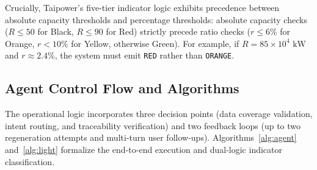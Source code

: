 \documentclass[conference]{IEEEtran}
\begin{document}
Crucially, Taipower's five-tier indicator logic exhibits precedence between absolute capacity thresholds and percentage thresholds: absolute capacity checks ($R \le 50$ for Black, $R \le 90$ for Red) strictly precede ratio checks ($r \le 6\%$ for Orange, $r < 10\%$ for Yellow, otherwise Green). For example, if $R = 85 \times 10^4\text{ kW}$ and $r \approx 2.4\%$, the system must emit \texttt{RED} rather than \texttt{ORANGE}.

\subsection{Agent Control Flow and Algorithms}
\label{sec:algorithms}

The operational logic incorporates three decision points (data coverage validation, intent routing, and traceability verification) and two feedback loops (up to two regeneration attempts and multi-turn user follow-ups). Algorithms~\ref{alg:agent} and~\ref{alg:light} formalize the end-to-end execution and dual-logic indicator classification.
\end{document}
